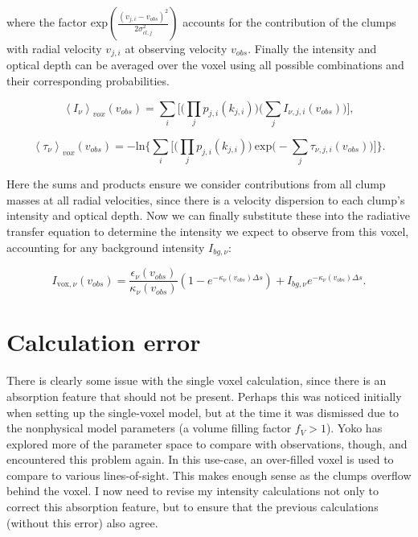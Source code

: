 \documentclass[a4paper]{article}
\begin{document}
    where the factor \(\mathrm{exp}(\frac{(v_{j,i} - v_{obs})^2}{2 \sigma_{cl, j}^2})\) accounts for the contribution of the clumps with radial velocity \(v_{j,i}\) at observing velocity \(v_{obs}\).
    Finally the intensity and optical depth can be averaged over the voxel using all possible combinations and their corresponding probabilities.

    \begin{equation}
    \label{voxel-averaged intensity}
    \left< I_\nu \right>_{vox} (v_{obs}) = \sum_i \bigg[ \Big( \prod_j p_{j,i}(k_{j,i}) \Big) \Big( \sum_j I_{\nu,j,i} (v_{obs}) \Big) \bigg],
    \end{equation}

    \begin{equation}
    \label{voxel-averaged optical depth}
    \left< \tau_\nu \right>_{vox} (v_{obs}) = -\mathrm{ln} \Bigg\{ \sum_i \bigg[ \Big( \prod_j p_{j,i}(k_{j,i}) \Big) \ \mathrm{exp} \Big( - \sum_j \tau_{\nu,j,i} (v_{obs}) \Big) \bigg] \Bigg\}.
    \end{equation}

    Here the sums and products ensure we consider contributions from all clump masses at all radial velocities, since there is a velocity dispersion to each clump's intensity and optical depth.
    Now we can finally substitute these into the radiative transfer equation to determine the intensity we expect to observe from this voxel, accounting for any background intensity \(I_{bg, \nu}\):

    \begin{equation}
    \label{voxel intensity}
    I_{\mathrm{vox},\nu} (v_{obs}) = \frac{\epsilon_\nu (v_{obs})}{\kappa_\nu (v_{obs})} \left( 1 - e^{-\kappa_\nu (v_{obs}) \Delta s} \right) + I_{bg, \nu} e^{-\kappa_\nu (v_{obs}) \Delta s}.
    \end{equation}


    \section{Calculation error}

    There is clearly some issue with the single voxel calculation, since there is an absorption feature that should not be present.
    Perhaps this was noticed initially when setting up the single-voxel model, but at the time it was dismissed due to the nonphysical model parameters (a volume filling factor \(f_V > 1\)).
    Yoko has explored more of the parameter space to compare with observations, though, and encountered this problem again.
    In this use-case, an over-filled voxel is used to compare to various lines-of-sight.
    This makes enough sense as the clumps overflow behind the voxel.
    I now need to revise my intensity calculations not only to correct this absorption feature, but to ensure that the previous calculations (without this error) also agree.
\end{document}
